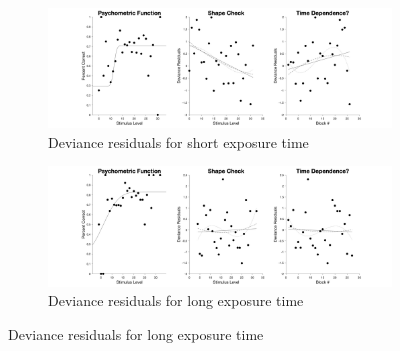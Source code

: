 \documentclass{article}
\begin{document}
\begin{figure}[!hb]
    \begin{subfigure}{\textwidth}
        \centering
        \includegraphics[width = \linewidth]{Thesis/plots/gof/segSize/segSize_mae_short_deviance.png}
        \caption{Deviance residuals for short exposure time}
    \end{subfigure}
    \begin{subfigure}{\textwidth}
        \centering
        \includegraphics[width = \linewidth]{Thesis/plots/gof/segSize/segSize_mae_long_deviance.png}
        \caption{Deviance residuals for long exposure time}
    \end{subfigure}
\end{figure}

\clearpage
\end{document}

